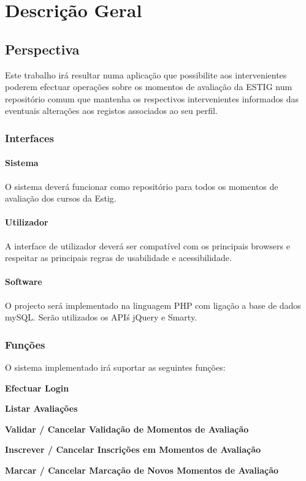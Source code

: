 

\chapter{Descrição Geral}

\paragraph{}

\section{Perspectiva}
Este trabalho irá resultar numa aplicação que possibilite aos intervenientes poderem efectuar operações sobre os momentos de avaliação da ESTIG num repositório comum que mantenha os respectivos intervenientes informados das eventuais alterações aos registos associados ao seu perfil.\\

\subsection{Interfaces}
\subsubsection{Sistema}
O sistema deverá funcionar como repositório para todos os momentos de avaliação dos cursos da Estig.

\subsubsection{Utilizador}
A interface de utilizador deverá ser compatível com os principais browsers e respeitar as principais regras de usabilidade e acessibilidade.

\subsubsection{Software}
O projecto será implementado na linguagem PHP com ligação a base de dados mySQL. Serão utilizados os API\'s jQuery e Smarty.

\subsection{Funções}
O sistema implementado irá suportar as seguintes funções:

\begin{list}{-}{}
\item \textbf{Efectuar Login}
\item \textbf{Listar Avaliações}
\item \textbf{Validar / Cancelar Validação de Momentos de Avaliação}
\item \textbf{Inscrever / Cancelar Inscrições em Momentos de Avaliação}
\item \textbf{Marcar / Cancelar Marcação de Novos Momentos de Avaliação}
\end{list}

